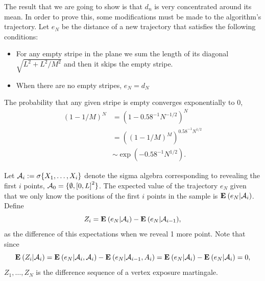 The result that we are going to show is that $d_n$ is very concentrated around its mean. In order to prove this, some modifications must be made to the algorithm's trajectory. Let $e_N$ be the distance of a new trajectory that satisfies the following conditions:
\begin{itemize}
    \item For any empty stripe in the plane we sum the length of its diagonal $\sqrt{L^2+ L^2/M^2}$ and then it skips the empty stripe.
    \item When there are no empty stripes, $e_N = d_N$ 
\end{itemize}
 The probability that any given stripe is empty converges exponentially to 0,
\[ \begin{array}{rl}
    {(1- 1/M)}^N & = {(1- 0.58^{-1} N^{-1/2})}^N\\[1em]
    & = {\left({(1- 1/M)}^{M}\right)}^{0.58^{-1} N^{1/2}}\\[1em]
    &  \sim \exp(-0.58^{-1} N^{1/2}).
\end{array} \] 


Let $\mathcal{A}_i := \sigma\{X_1,\ldots,X_i\}$ denote the sigma algebra corresponding to revealing the first $i$ points, $\mathcal{A}_0 = \{\emptyset, {[0,L]}^2\}$. The expected value of the trajectory $e_N$ given that we only know the positions of the first $i$ points in the sample is $\mathbf{E}\: (e_N | \mathcal{A}_i)$. Define
\[ Z_i = \mathbf{E}\: (e_N | \mathcal{A}_i) - \mathbf{E}\: (e_N | \mathcal{A}_{i-1}),  \]  
as the difference of this expectations when we reveal 1 more point. Note that since
\[ \mathbf{E}\:(Z_i | \mathcal{A}_i) =  \mathbf{E}\: (e_N | \mathcal{A}_i, \mathcal{A}_i) - \mathbf{E}\: (e_N | \mathcal{A}_{i-1}, A_i) = \mathbf{E}\: (e_N | \mathcal{A}_i) - \mathbf{E}\: (e_N | \mathcal{A}_i) = 0,\] 
$Z_1, \ldots, Z_N$ is the difference sequence of a vertex exposure martingale.



